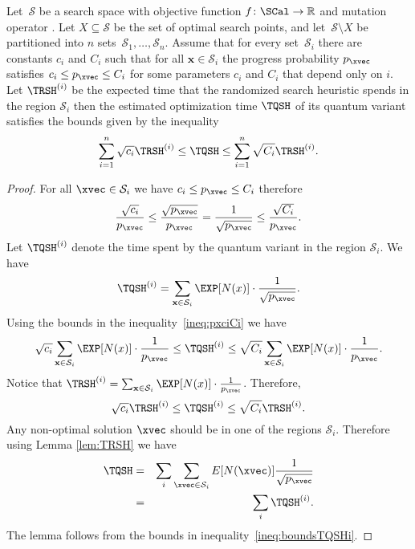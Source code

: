 \begin{lemma}\label{lem:regions}
  Let~$\mathcal{S}$ be a search space with objective function $f\colon
  \SCal\to\mathbb{R}$ and mutation operator \MutOp.  Let $X\subseteq
  \mathcal{S}$ be the set of optimal search points, and
  let~$\mathcal{S}\setminus X$ be partitioned into $n$
  sets~$\mathcal{S}_1, \ldots, \mathcal{S}_n$. Assume that for every
  set~$\mathcal{S}_i$ there are constants $c_i$ and $C_i$ such that
  for all $\mathbf{x}\in\mathcal{S}_i$ the progress probability
  $p_{\xvec}$ satisfies $c_i\leq p_{\xvec} \leq C_i$ for some
  parameters $c_i$ and $C_i$ that depend only on $i$.  Let
  $\TRSH^{(i)}$ be the expected time that the randomized search
  heuristic spends in the region $\mathcal{S}_i$ then the estimated
  optimization time $\TQSH$ of its quantum variant satisfies the bounds given by
  the inequality
  \[
  \sum_{i=1}^n \sqrt{c_i} \TRSH^{(i)} \le \TQSH \le \sum_{i=1}^n \sqrt{C_i}\TRSH^{(i)}.
  \]  

\end{lemma}
\begin{proof}
  
  For all $\xvec \in \mathcal{S}_i$ we have $c_i \leq p_{\xvec} \leq
  C_i$ therefore
  \begin{equation} \label{ineq:pxciCi}
  \frac{\sqrt{c_i}}{p_{\xvec}} \leq \frac{\sqrt{p_{\xvec}}}{p_{\xvec}} =
  \frac{1}{\sqrt{p_{\xvec}}} \leq \frac{\sqrt{C_i}}{p_{\xvec}}.
  \end{equation}
  Let $\TQSH^{(i)}$ denote the time spent by the quantum variant in
  the region $\mathcal{S}_i$. We have
  \[
  \TQSH^{(i)} =
  \sum_{\mathbf{x}\in\mathcal{S}_i} \EXP[N(x)] \cdot \frac{1}{\sqrt{p_{\xvec}}}.
  \]
  Using the bounds in the inequality~\ref{ineq:pxciCi} we  have
  \[
  \sqrt{c_i} \sum_{\mathbf{x}\in\mathcal{S}_i} \EXP[N(x)] \cdot
  \frac{1}{p_{\xvec}} %
  \leq \TQSH^{(i)} \leq %
  \sqrt{C_i} \sum_{\mathbf{x}\in\mathcal{S}_i} \EXP[N(x)] \cdot
  \frac{1}{p_{\xvec}}.
  \]
  Notice that $\TRSH^{(i)} = \sum_{\mathbf{x}\in\mathcal{S}_i}
  \EXP[N(x)] \cdot \frac{1}{p_{\xvec}}$. Therefore,
  \begin{equation}\label{ineq:boundsTQSHi}
    \sqrt{c_i}
    \TRSH^{(i)} \leq \TQSH^{(i)} \leq \sqrt{C_i} \TRSH^{(i)}.
  \end{equation}
  Any non-optimal solution $\xvec$ should be in one of the regions $\mathcal{S}_i$. Therefore
  using Lemma \ref{lem:TRSH} we have
  \begin{eqnarray*}
    \TQSH  & = &   \sum_i \sum_{\xvec\in\mathcal{S}_i} E[N({\xvec})] \frac{1}{\sqrt{p_{\xvec}}}\\
    & = & \sum_i  \TQSH^{(i)}.
  \end{eqnarray*}
  The lemma follows from the bounds in
  inequality~\ref{ineq:boundsTQSHi}.
\end{proof}


